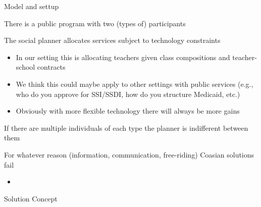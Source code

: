 \documentclass[t,aspectratio=169,11pt,presentation]{beamer}
\newenvironment{wideitemize}{\itemize\addtolength{\itemsep}{14pt}}{\enditemize}
\begin{document}



\begin{frame}{Model and settup }

\begin{wideitemize}
     \item There is a public program with two (types of) participants
     \item The social planner allocates services subject to technology constraints
     \begin{itemize}
         \item In our setting this is allocating teachers given class compositions and teacher-school contracts
         \item We think this could maybe apply to other settings with public services (e.g., who do you approve for SSI/SSDI, how do you structure Medicaid, etc.)
         \item Obviously with more flexible technology there will always be more gains
     \end{itemize}
     \item If there are multiple individuals of each type the planner is indifferent between them
     \item For whatever reason (information, communication, free-riding) Coasian solutions fail
     \begin{itemize}
         \item 
     \end{itemize}
     

\end{wideitemize}
\end{frame}


\begin{frame}[c]{Solution Concept }


\centering
{}


\end{frame}
\end{document}
